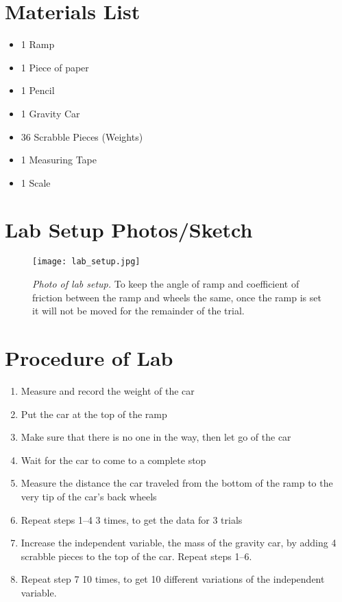 \documentclass[12pt]{article}
\begin{document}
\section{Materials List}

\begin{itemize}
	\item 1 Ramp
	\item 1 Piece of paper
	\item 1 Pencil
	\item 1 Gravity Car
	\item 36 Scrabble Pieces (Weights)
	\item 1 Measuring Tape
	\item 1 Scale
\end{itemize}

\section{Lab Setup Photos/Sketch}

\begin{figure}[H]
	\centering
	\texttt{[image: lab\_setup.jpg]}
	\caption{\textit{Photo of lab setup.} To keep the angle of ramp and coefficient of friction between the ramp and wheels the same, once the ramp is set it will not be moved for the remainder of the trial.}
\end{figure}

\section{Procedure of Lab}

\begin{enumerate}
	\item Measure and record the weight of the car
	\item Put the car at the top of the ramp
	\item Make sure that there is no one in the way, then let go of the car
	\item Wait for the car to come to a complete stop
	\item Measure the distance the car traveled from the bottom of the ramp to the very tip of the car's back wheels
	\item Repeat steps 1--4 3 times, to get the data for 3 trials
	\item Increase the independent variable, the mass of the gravity car, by adding 4 scrabble pieces to the top of the car. Repeat steps 1--6.
	\item Repeat step 7 10 times, to get 10 different variations of the independent variable.
\end{enumerate}
\end{document}
